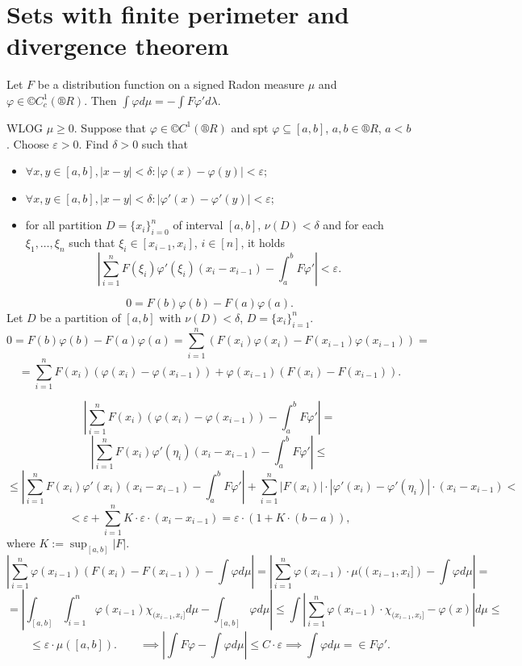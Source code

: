 \documentclass[12pt]{article}					%
\begin{document}
\section{Sets with finite perimeter and divergence theorem}
\begin{lemma}
	Let $F$ be a distribution function on a signed Radon measure $μ$ and $φ \in ©C_c^1(®R)$. Then $\int φ dμ = -\int F φ' dλ$.

	\begin{dukazin}
		WLOG $μ ≥ 0$. Suppose that $φ \in ©C^1(®R)$ and spt $φ \subseteq [a, b]$, $a, b \in ®R$, $a < b$. Choose $ε > 0$. Find $δ > 0$ such that
		\begin{itemize}
			\item $\forall x, y \in [a, b], |x - y| < δ: |φ(x) - φ(y)| < ε$;
			\item $\forall x, y \in [a, b], |x - y| < δ: |φ'(x) - φ'(y)| < ε$;
			\item for all partition $D = \{x_i\}_{i=0}^n$ of interval $[a, b]$, $ν(D) < δ$ and for each $ξ_1, …, ξ_n$ such that $ξ_i \in [x_{i-1}, x_i]$, $i \in [n]$, it holds
				$$ \left|\sum_{i=1}^n F(ξ_i) φ'(ξ_i)(x_i - x_{i-1}) - \int_a^b F φ'\right| < ε. $$
		\end{itemize}\vspace{-1em}

		$$ 0 = F(b)φ(b) - F(a)φ(a). $$
		Let $D$ be a partition of $[a, b]$ with $ν(D) < δ$, $D = \{x_i\}_{i=1}^n$.
		$$ 0 = F(b)φ(b) - F(a)φ(a) = \sum_{i=1}^n(F(x_i)φ(x_i) - F(x_{i-1})φ(x_{i-1})) = $$
		$$ = \sum_{i=1}^n F(x_i)(φ(x_i) - φ(x_{i-1})) + φ(x_{i-1})(F(x_i) - F(x_{i-1})). $$

		$$ \left|\sum_{i=1}^n F(x_i) (φ(x_i) - φ(x_{i-1})) - \int_a^b F φ'\right| = $$
		$$ \left|\sum_{i=1}^n F(x_i) φ'(η_i)(x_i - x_{i-1}) - \int_a^b F φ'\right| ≤ $$
		$$ ≤ \left|\sum_{i=1}^n F(x_i) φ'(x_i)(x_i - x_{i-1}) - \int_a^b F φ'\right| + \sum_{i=1}^n|F(x_i)|·|φ'(x_i) - φ'(η_i)|·(x_i - x_{i-1}) < $$
		$$ < ε + \sum_{i=1}^n K·ε·(x_i - x_{i-1}) = ε·(1 + K·(b - a)), $$
		where $K := \sup_{[a, b]} |F|$.
		$$ \left|\sum_{i=1}^n φ(x_{i-1})(F(x_i) - F(x_{i-1})) - \int φ dμ\right| = \left|\sum_{i=1}^n φ(x_{i-1})·μ((x_{i-1}, x_i]) - \int φ dμ\right| = $$
		$$ = \left|\int_{[a, b]} \int_{i=1}^n φ(x_{i-1}) χ_{(x_{i-1}, x_i]} dμ - \int_{[a, b]} φ dμ\right| ≤ \int\left|\sum_{i=1}^n φ(x_{i-1})·χ_{(x_{i-1}, x_i]} - φ(x)\right| dμ ≤ $$
		$$ ≤ ε·μ([a, b]). \qquad \implies \left|\int F φ - \int φ dμ\right| ≤ C·ε \implies \int φ dμ = \in Fφ'. $$
	\end{dukazin}
\end{lemma}
\end{document}
